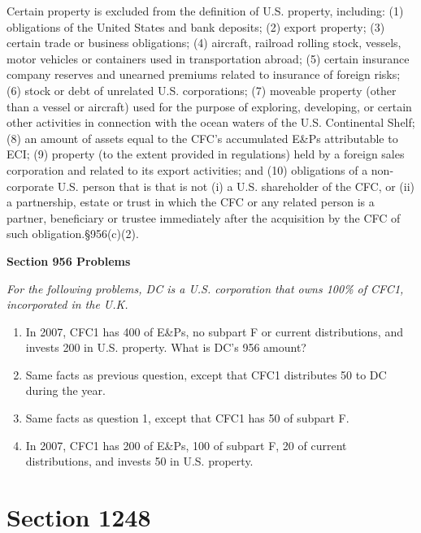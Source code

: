 Certain property is excluded from the definition of U.S. property, including:  (1) obligations of the United States and bank deposits; (2) export property; (3) certain trade or business obligations; (4) aircraft, railroad rolling stock, vessels, motor vehicles or containers used in transportation abroad; (5) certain insurance company reserves and unearned premiums related to insurance of foreign risks; (6) stock or debt of unrelated U.S. corporations; (7) moveable property (other than a vessel or aircraft) used for the purpose of exploring, developing, or certain other activities in connection with the ocean waters of the U.S. Continental Shelf; (8) an amount of assets equal to the CFC's accumulated E\&Ps attributable to ECI; (9) property (to the extent provided in regulations) held by a foreign sales corporation and related to its export activities; and (10) obligations of a non-corporate U.S. person that is that is not (i) a U.S. shareholder of the CFC, or (ii) a partnership, estate or trust in which the CFC or any related person is a partner, beneficiary or trustee immediately after the acquisition by the CFC of such obligation.\S956(c)(2).


	\begin{center}
		\textbf{Section 956 Problems}
	\end{center}
	\begin{select}
	\emph{For the following problems, DC is a U.S. corporation that owns 100\% of CFC1, incorporated in the U.K.}
			\begin{enumerate}
				\item In 2007, CFC1 has 400 of E\&Ps, no subpart F or current distributions, and invests 200 in U.S. property.  What is DC's 956 amount?
				\item Same facts as previous question, except that CFC1 distributes 50 to DC during the year.
				\item Same facts as question 1, except that CFC1 has 50 of subpart F.
				\item In 2007, CFC1 has 200 of E\&Ps, 100 of subpart F, 20 of current distributions, and invests 50 in U.S. property.
			\end{enumerate}
		\end{select} 	


\section{Section 1248}
			
